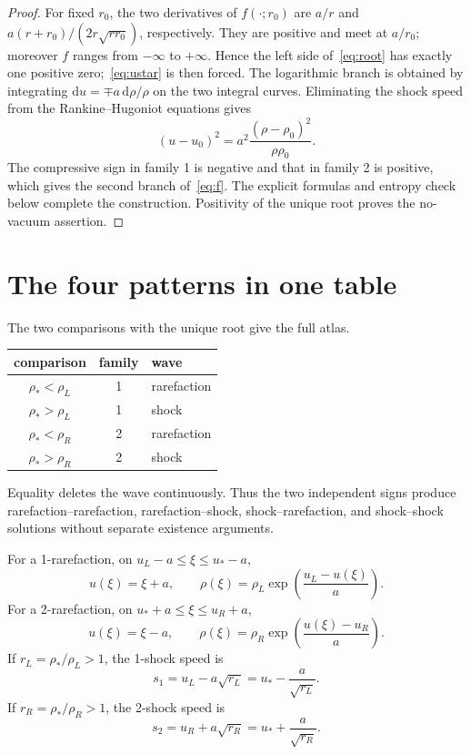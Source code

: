 \documentclass[10pt]{article}
\newcommand{\dd}{\mathrm d}
\begin{document}
\begin{proof}
For fixed $r_0$, the two derivatives of $f(\cdot;r_0)$ are
$a/r$ and $a(r+r_0)/(2r\sqrt{rr_0})$, respectively.  They are positive and
meet at $a/r_0$; moreover $f$ ranges from $-\infty$ to $+\infty$.
Hence the left side of~\eqref{eq:root} has exactly one positive
zero;~\eqref{eq:ustar} is then forced.  The logarithmic branch is obtained by
integrating $\dd u=\mp a\,\dd\rho/\rho$ on the two integral curves.  Eliminating
the shock speed from the Rankine--Hugoniot equations gives
\begin{equation}\label{eq:hugoniot}
 (u-u_0)^2=a^2\frac{(\rho-\rho_0)^2}{\rho\rho_0}.
\end{equation}
The compressive sign in family 1 is negative and that in family 2 is positive,
which gives the second branch of~\eqref{eq:f}.  The explicit formulas and
entropy check below complete the construction.  Positivity of the unique
root proves the no-vacuum assertion.
\end{proof}

\section{The four patterns in one table}
The two comparisons with the unique root give the full atlas.
\begin{center}
\begin{tabular}{ccl}
\toprule
comparison & family & wave\\
\midrule
$\rho_*<\rho_L$ & 1 & rarefaction\\
$\rho_*>\rho_L$ & 1 & shock\\
$\rho_*<\rho_R$ & 2 & rarefaction\\
$\rho_*>\rho_R$ & 2 & shock\\
\bottomrule
\end{tabular}
\end{center}
Equality deletes the wave continuously.  Thus the two independent signs
produce rarefaction--rarefaction, rarefaction--shock, shock--rarefaction, and
shock--shock solutions without separate existence arguments.

For a 1-rarefaction, on $u_L-a\le\xi\le u_*-a$,
\begin{equation}\label{eq:r1}
 u(\xi)=\xi+a,\qquad
 \rho(\xi)=\rho_L\exp\!\left(\frac{u_L-u(\xi)}a\right).
\end{equation}
For a 2-rarefaction, on $u_*+a\le\xi\le u_R+a$,
\begin{equation}\label{eq:r2}
 u(\xi)=\xi-a,\qquad
 \rho(\xi)=\rho_R\exp\!\left(\frac{u(\xi)-u_R}a\right).
\end{equation}
If $r_L=\rho_*/\rho_L>1$, the 1-shock speed is
\begin{equation}\label{eq:s1}
 s_1=u_L-a\sqrt{r_L}=u_*-\frac a{\sqrt{r_L}}.
\end{equation}
If $r_R=\rho_*/\rho_R>1$, the 2-shock speed is
\begin{equation}\label{eq:s2}
 s_2=u_R+a\sqrt{r_R}=u_*+\frac a{\sqrt{r_R}}.
\end{equation}
\end{document}
